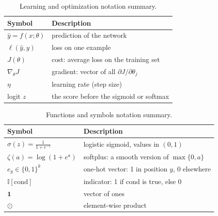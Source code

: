 \begin{table}[H]
\centering
\small
\begin{tabular}{ll}
\toprule
\textbf{Symbol} & \textbf{Description} \\
\midrule
$\hat{y} = f(x; \theta)$ & prediction of the network \\
$\ell(\hat{y}, y)$ & loss on one example \\
$J(\theta)$ & cost: average loss on the training set \\
$\nabla_\theta J$ & gradient: vector of all $\partial J / \partial \theta_j$ \\
$\eta$ & learning rate (step size) \\
logit $z$ & the score before the sigmoid or softmax \\
\bottomrule
\end{tabular}
\caption{Learning and optimization notation summary.}
\label{tab:learning_notation}
\end{table}

\begin{table}[H]
\centering
\small
\begin{tabular}{ll}
\toprule
\textbf{Symbol} & \textbf{Description} \\
\midrule
$\sigma(z) = \frac{1}{1 + e^{-z}}$ & logistic sigmoid, values in $(0, 1)$ \\
$\zeta(a) = \log(1 + e^a)$ & softplus: a smooth version of $\max\{0, a\}$ \\
$e_y \in \{0, 1\}^k$ & one-hot vector: 1 in position $y$, 0 elsewhere \\
$\mathbb{I}[\text{cond}]$ & indicator: 1 if cond is true, else 0 \\
$\mathbf{1}$ & vector of ones \\
$\odot$ & element-wise product \\
\bottomrule
\end{tabular}
\caption{Functions and symbols notation summary.}
\label{tab:functions_notation}
\end{table}
